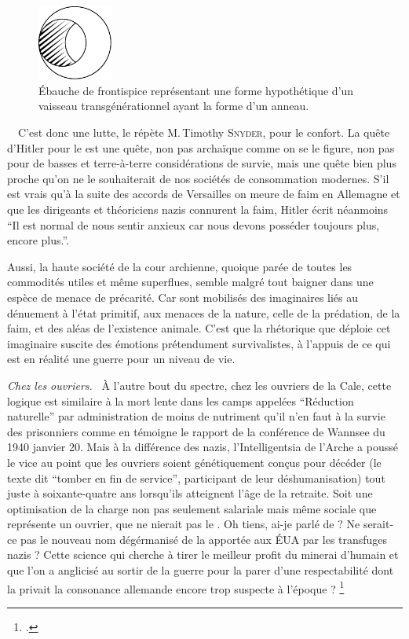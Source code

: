 \begin{figure}
	\vspace{-1em}
	\centering
	\includegraphics[width=0.22\textwidth]{frontispice-arche-evidee.pdf}
	\caption{Ébauche de frontispice représentant une forme hypothétique d’un vaisseau transgénérationnel ayant la forme d’un anneau.}
	\vspace{-10pt}
\end{figure}
\
\
C’est donc une lutte, le répète M.\,Timothy \textsc{Snyder}, pour le confort.  La quête d’Hitler pour le  est une quête, non pas archaïque comme on se le figure, non pas pour de basses et terre-à-terre considérations de survie, mais une quête bien plus proche qu’on ne le souhaiterait de nos sociétés de consommation modernes. S’il est vrais qu’à la suite des accords de Versailles on meure  de faim en Allemagne et que les dirigeants et théoriciens nazis connurent la faim, Hitler écrit néanmoins \enquote{Il est normal de nous  sentir anxieux car nous devons posséder toujours plus, encore plus.}.

Aussi, la haute société de la cour archienne, quoique parée de toutes les commodités utiles et même superflues, semble malgré tout baigner dans une espèce de menace de précarité. Car sont mobilisés des imaginaires liés au dénuement à l’état primitif, aux menaces de la nature, celle de la prédation, de la faim, et des aléas de l’existence animale.
C’est que la rhétorique que déploie cet imaginaire suscite des émotions prétendument survivalistes, à l’appuis de ce qui est en réalité une guerre pour un niveau de vie.

{\em\normalsize Chez les ouvriers.}~
À l’autre bout du spectre, chez les ouvriers de la Cale, cette logique est similaire à la mort lente dans les camps appelées \enquote{Réduction naturelle} par administration de moins de nutriment qu’il n’en faut à la survie des prisonniers comme en témoigne le rapport de la conférence de Wannsee du 1940 janvier 20. Mais à la différence des nazis, l’Intelligentsia de l’Arche a poussé le vice au point que les ouvriers soient génétiquement conçus pour décéder (le texte dit \enquote{tomber en fin de service}, participant de leur déshumanisation) tout juste à soixante-quatre ans lorsqu’ils atteignent l’âge de la retraite. Soit une optimisation de la charge non pas seulement salariale mais même sociale que représente un ouvrier, que ne nierait pas le . Oh tiens, ai-je parlé de  ?
Ne serait-ce pas le nouveau nom dégérmanisé de la  apportée aux ÉUA par les transfuges nazis ? Cette science qui cherche à tirer le meilleur profit du minerai d’humain  et que l’on a anglicisé au sortir de la guerre pour la parer d’une respectabilité dont la privait la consonance allemande encore trop suspecte à l’époque ?
\footcite{JohannChapoutot-NRF2020-libresDObéir}


